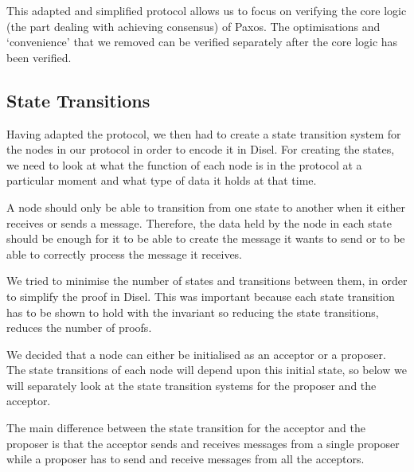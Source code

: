 This adapted and simplified protocol allows us to focus on verifying the core
logic (the part dealing with achieving consensus) of Paxos. The
optimisations and `convenience' that we removed can be verified separately after
the core logic has been verified.


\subsection{State Transitions}
Having adapted the protocol, we then had to create a state transition system for
the nodes in our protocol in order to encode it in Disel. For creating the states,
we need to look at what the function of each node is in the protocol at a particular
moment and what type of data it holds at that time.

A node should only be able to transition from one state to another when it either
receives or sends a message. Therefore, the data held by the node in each state
should be enough for it to be able to create the message it wants to send or to
be able to correctly process the message it receives.

We tried to minimise the number of states and transitions between them, in order
to simplify the proof in Disel. This was important because each state transition
has to be shown to hold with the invariant so reducing the state transitions,
reduces the number of proofs.

We decided that a node can either be initialised as an acceptor or a proposer.
The state transitions of each node will depend upon this initial state, so below
we will separately look at the state transition systems for the proposer and the
acceptor.

The main difference between the state transition for the acceptor and the proposer
is that the acceptor sends and receives messages from a single proposer while a
proposer has to send and receive messages from all the acceptors.


